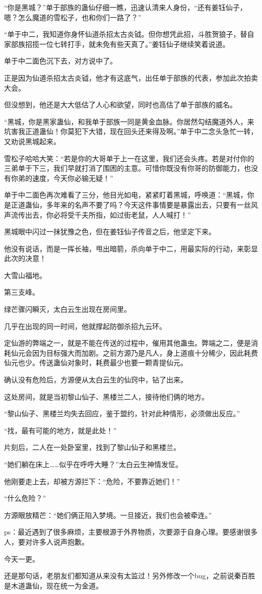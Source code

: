 \begin{this_body}
“你是黑城？”单于部族的蛊仙仔细一瞧，迅速认清来人身份，“还有姜钰仙子，嗯？怎么魔道的雪松子，也和你们一路了？”

“单于中二，我知道你身怀仙道杀招太古炎钺。但你想凭此招，斗胜贺狼子，替自家部族招揽一位七转打手，就未免有些天真了。”姜钰仙子继续笑着说道。

单于中二面色沉下去，对方说中了。

正是因为仙道杀招太古炎钺，他才有这底气，出任单于部族的代表，参加此次拍卖大会。

但没想到，他还是大大低估了人心和欲望，同时也高估了单于部族的威名。

“黑城，你是黑家蛊仙，和我单于部族一同是黄金血脉。你居然勾结魔道外人，来坑害我正道蛊仙！你莫犯下大错，现在回头还来得及啊。”单于中二念头急忙一转，又劝说黑城起来。

雪松子哈哈大笑：“若是你的大哥单于上一在这里，我们还会头疼。若是对付你的三弟单于下三，我们早就打消了围困的主意。可惜你既没有你哥的防御能力，也没有你弟的速度，今天你必输无疑！”

单于中二面色再次难看了三分，他目光如电，紧紧盯着黑城，呼唤道：“黑城，你是正道蛊仙，多年来的名声不要了吗？今天这件事情要是暴露出去，只要有一丝风声流传出去，你必将受千夫所指，如过街老鼠，人人喊打！”

黑城眼中闪过一抹犹豫之色，但在姜钰仙子传音之后，他坚定下来。

他没有说话，而是一挥长袖，甩出暗箭，杀向单于中二，用最实际的行动，来彰显此次的决意！

大雪山福地。

第三支峰。

绿芒骤闪瞬灭，太白云生出现在房间里。

几乎在出现的同一时间，他就撑起防御杀招九云环。

定仙游的弊端之一，就是不能在传送的过程中，催用其他蛊虫。弊端之二，便是消耗仙元会因为目标强大而加剧。之前方源乃是凡人，身上道痕十分稀少，因此耗费仙元也少。传送蛊仙对象时，耗费最少也要一颗青提仙元。

确认没有危险后，方源便从太白云生的仙窍中，钻了出来。

这处房间，就是当初黎山仙子、黑楼兰二人，接待他们俩的地方。

“黎山仙子、黑楼兰均失去回应，鉴于盟约，针对此种情形，必须做出反应。”

“找，最有可能的地方，就是此处！”

片刻后，二人在一处卧室里，找到了黎山仙子和黑楼兰。

“她们躺在床上……似乎在呼呼大睡？”太白云生神情发怔。

他刚要走上去，却被方源拦下：“危险，不要靠近她们！”

“什么危险？”

方源眼放精芒：“她们俩正陷入梦境。一旦接近，我们也会被牵连。”

ps：最近遇到了很多麻烦，主要根源于外界物质，次要源于自身心理。要感谢很多人，要对许多人说声抱歉。

今天一更。

还是那句话，老朋友们都知道从来没有太监过！另外修改一个bug，之前说秦百胜是木道蛊仙，现在统一为金道。

\end{this_body}

